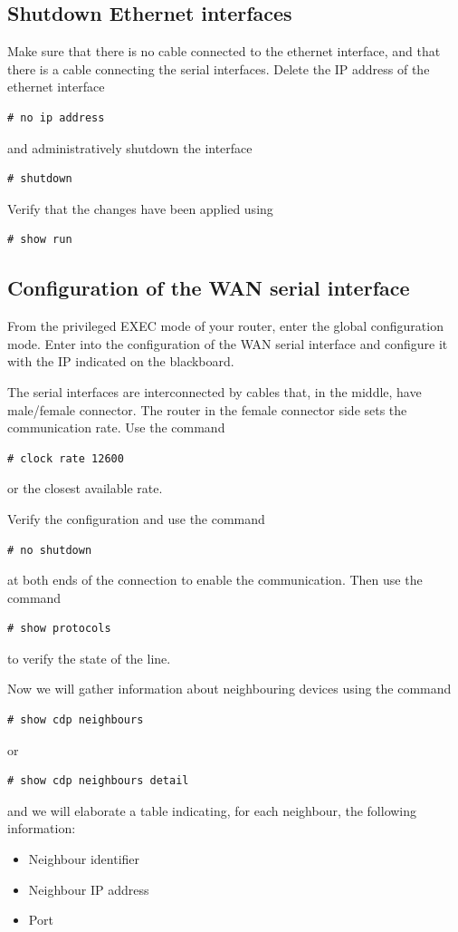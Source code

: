 \subsection{Shutdown Ethernet interfaces}

Make sure that there is no cable connected to the ethernet interface, and that there is a cable connecting the serial interfaces.
Delete the IP address of the ethernet interface
\begin{lstlisting}
# no ip address
\end{lstlisting}
and administratively shutdown the interface
\begin{lstlisting}
# shutdown
\end{lstlisting}

Verify that the changes have been applied using
\begin{lstlisting}
# show run
\end{lstlisting}

\subsection{Configuration of the WAN serial interface}

From the privileged EXEC mode of your router, enter the global configuration mode.
Enter into the configuration of the WAN serial interface and configure it with the IP indicated on the blackboard.

The serial interfaces are interconnected by cables that, in the middle, have male/female connector.
The router in the female connector side sets the communication rate.
Use the command 
\begin{lstlisting}
# clock rate 12600
\end{lstlisting}
or the closest available rate.

Verify the configuration and use the command
\begin{lstlisting}
# no shutdown 
\end{lstlisting}
at both ends of the connection to enable the communication.
Then use the command
\begin{lstlisting}
# show protocols
\end{lstlisting}
to verify the state of the line.

Now we will gather information about neighbouring devices using the command
\begin{lstlisting}
# show cdp neighbours
\end{lstlisting}
or 
\begin{lstlisting}
# show cdp neighbours detail
\end{lstlisting}
and we will elaborate a table indicating, for each neighbour, the following information:
\begin{itemize}
\item Neighbour identifier
\item Neighbour IP address
\item Port
\end{itemize}

